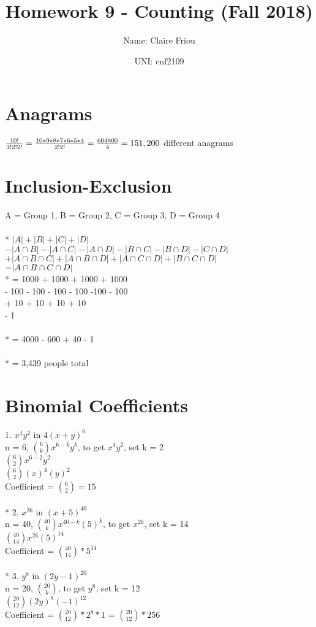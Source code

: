 \documentclass{article}
\title{Homework 9 - Counting  (Fall 2018)}
\author
{
Name: Claire Friou
\and UNI: cnf2109
}
\begin{document}
    \maketitle
    
    \section{Anagrams}
$\frac{10!}{3!2!2!} \\
= \frac{10*9*8*7*6*5*4}{2!2!} \\
= \frac{604800}{4} \\
= 151,200$ different anagrams

    \newpage
    \section{Inclusion-Exclusion}
A = Group 1, B = Group 2, C = Group 3, D = Group 4\\
\\*
$|A| + |B| + |C| + |D|$\\
$- |A \cap B| - |A \cap C| - |A \cap D| - |B \cap C| - |B \cap D| - |C \cap D|$\\
$+ |A \cap B \cap C| + |A \cap B \cap D| + |A \cap C \cap D| + |B \cap C \cap D|$\\
$- |A \cap B \cap C \cap D|\\$
\\*
= 1000 + 1000 + 1000 + 1000\\
- 100 - 100 - 100 - 100 -100 - 100\\
+ 10 + 10 + 10 + 10\\
- 1\\
\\*
= 4000 - 600 + 40 - 1\\
\\*
= 3,439 people total

    \newpage    
    \section{Binomial Coefficients}
1. $x^4y^2$ in 4$(x+y)^6$\\
n = 6, ${6\choose k} x^{6-k}y^{k}$, to get $x^4y^2$, set k = 2\\
${6\choose 2} x^{6-2}y^{2}$\\
${6 \choose 2}(x)^4(y)^2$\\
Coefficient = ${6 \choose 2} = 15$\\
\\*
2. $x^{26}$ in $(x+5)^{40}$\\
n = 40, ${40 \choose k}x^{40-k}(5)^k$, to get $x^{26}$, set k = 14\\
${40 \choose 14}x^{26}(5)^{14}$\\
Coefficient = ${40 \choose 14}*5^{14}$\\
\\*
3. $y^8$ in $(2y-1)^{20}$\\
n = 20, ${20 \choose k}$, to get $y^8$, set k = 12\\
${20 \choose 12}(2y)^{8}(-1)^{12}$\\
Coefficient = ${20 \choose 12}*2^8*1$ = ${20 \choose 12}*256$
\newpage
\end{document}
